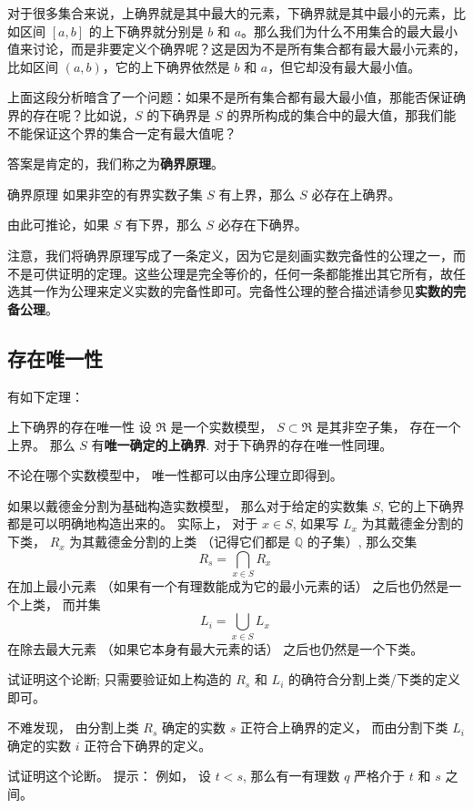 对于很多集合来说，上确界就是其中最大的元素，下确界就是其中最小的元素，比如区间 $[a, b]$ 的上下确界就分别是 $b$ 和 $a$。那么我们为什么不用集合的最大最小值来讨论，而是非要定义个确界呢？这是因为不是所有集合都有最大最小元素的，比如区间 $(a, b)$，它的上下确界依然是 $b$ 和 $a$，但它却没有最大最小值。

上面这段分析暗含了一个问题：如果不是所有集合都有最大最小值，那能否保证确界的存在呢？比如说，$S$ 的下确界是 $S$ 的界所构成的集合中的最大值，那我们能不能保证这个界的集合一定有最大值呢？

答案是肯定的，我们称之为\textbf{确界原理}。

\begin{definition}{确界原理}\label{def_SupInf_3}
如果非空的有界实数子集 $S$ 有上界，那么 $S$ 必存在上确界。

由此可推论，如果 $S$ 有下界，那么 $S$ 必存在下确界。
\end{definition}

注意，我们将确界原理写成了一条定义，因为它是刻画实数完备性的公理之一，而不是可供证明的定理。这些公理是完全等价的，任何一条都能推出其它所有，故任选其一作为公理来定义实数的完备性即可。完备性公理的整合描述请参见\textbf{实数的完备公理}。

\subsection{存在唯一性}
有如下定理：

\begin{theorem}{上下确界的存在唯一性}
设 $\mathfrak{R}$ 是一个实数模型， $S\subset\mathfrak{R}$ 是其非空子集， 存在一个上界。 那么 $S$ 有\textbf{唯一确定的上确界}. 对于下确界的存在唯一性同理。
\end{theorem}

不论在哪个实数模型中， 唯一性都可以由序公理立即得到。

如果以戴德金分割为基础构造实数模型， 那么对于给定的实数集 $S$, 它的上下确界都是可以明确地构造出来的。 实际上， 对于 $x\in S$, 如果写 $L_x$ 为其戴德金分割的下类， $R_x$ 为其戴德金分割的上类 （记得它们都是 $\mathbb{Q}$ 的子集）, 那么交集
$$
R_s=\bigcap_{x\in S}R_x~
$$
在加上最小元素 （如果有一个有理数能成为它的最小元素的话） 之后也仍然是一个上类， 而并集
$$
L_i=\bigcup_{x\in S}L_x~
$$
在除去最大元素 （如果它本身有最大元素的话） 之后也仍然是一个下类。

\begin{exercise}{}
试证明这个论断; 只需要验证如上构造的 $R_s$ 和 $L_i$ 的确符合分割上类/下类的定义即可。
\end{exercise}

不难发现， 由分割上类 $R_s$ 确定的实数 $s$ 正符合上确界的定义， 而由分割下类 $L_i$ 确定的实数 $i$ 正符合下确界的定义。

\begin{exercise}{}
试证明这个论断。 提示： 例如， 设 $t<s$, 那么有一有理数 $q$ 严格介于 $t$ 和 $s$ 之间。 
\end{exercise}
